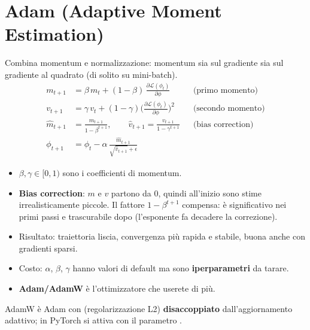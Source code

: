 \section{Adam (Adaptive Moment Estimation)}
Combina momentum e normalizzazione: momentum sia sul gradiente sia sul gradiente al quadrato (di solito su mini-batch).
\begin{align*}
m_{t+1} &= \beta\, m_t + (1-\beta)\,\frac{\partial\mathcal{L}(\phi_t)}{\partial\phi} && \text{(primo momento)}\\
v_{t+1} &= \gamma\, v_t + (1-\gamma)\Big(\frac{\partial\mathcal{L}(\phi_t)}{\partial\phi}\Big)^2 && \text{(secondo momento)}\\
\hat m_{t+1} &= \frac{m_{t+1}}{1-\beta^{t+1}}, \qquad \hat v_{t+1} = \frac{v_{t+1}}{1-\gamma^{t+1}} && \text{(bias correction)}\\
\phi_{t+1} &= \phi_t - \alpha\,\frac{\hat m_{t+1}}{\sqrt{\hat v_{t+1}}+\epsilon}
\end{align*}
\begin{itemize}
  \item $\beta, \gamma \in [0,1)$ sono i coefficienti di momentum.
  \item \textbf{Bias correction}: $m$ e $v$ partono da 0, quindi all'inizio sono stime irrealisticamente piccole. Il fattore
        $1-\beta^{t+1}$ compensa: è significativo nei primi passi e trascurabile dopo (l'esponente fa decadere la correzione).
  \item Risultato: traiettoria liscia, convergenza più rapida e stabile, buona anche con gradienti sparsi.
  \item Costo: $\alpha$, $\beta$, $\gamma$ hanno valori di default ma sono \textbf{iperparametri} da tarare.
  \item \textbf{Adam/AdamW} è l'ottimizzatore che userete di più.
\end{itemize}
\begin{integrazione}[AdamW]
AdamW è Adam con  (regolarizzazione L2) \textbf{disaccoppiato} dall'aggiornamento adattivo; in PyTorch si
attiva con il parametro .
\end{integrazione}

